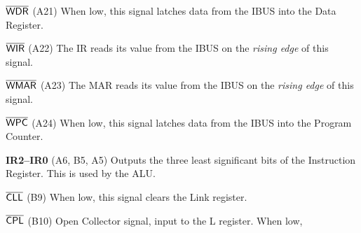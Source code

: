 \documentclass[11pt,a4paper,twocolumns]{article}
\newcommand{\ns}[1]{$\overline{\mbox{\textsf{{#1}}}}$}
\newcommand{\ps}[1]{\textsf{#1}}
\newcommand\bus[1]{{#1}}
\newcommand\IBUS{\bus{IBUS}}
\newcommand\register[1]{\textsf{#1}}
\newcommand\MAR{\register{MAR}}
\newcommand\IR{\register{IR}}
\newcommand\WDR{\ns{WDR}}
\newcommand\WIR{\ns{WIR}}
\newcommand\WMAR{\ns{WMAR}}
\newcommand\WPC{\ns{WPC}}
\newcommand\OPIFn[1]{\ps{OPIF{#1}}}
\newcommand\CLL{\ns{CLL}}
\newcommand\CPL{\ns{CPL}}
\newcommand\IRn[1]{\ps{IR{#1}}}
\begin{document}
\begin{description}
\item{\bf \WDR} (A21) When low, this signal latches data from the \IBUS{} into the Data Register.
\item{\bf \WIR} (A22) The \IR{} reads its value from the \IBUS{} on the {\em rising edge\/} of this signal.
\item{\bf \WMAR} (A23) The \MAR{} reads its value from the \IBUS{} on the {\em rising edge\/} of this signal.
\item{\bf \WPC} (A24) When low, this signal latches data from the \IBUS{} into the Program Counter.
\item{\bf \IRn{2}–\IRn{0}} (A6, B5, A5) Outputs the three least
  significant bits of the Instruction Register. This is used by the
  ALU.
\item{\bf \CLL} (B9) When low, this signal clears the Link register.
\item{\bf \CPL} (B10) Open Collector signal, input to the L register. When low,

\end{description}
\end{document}
